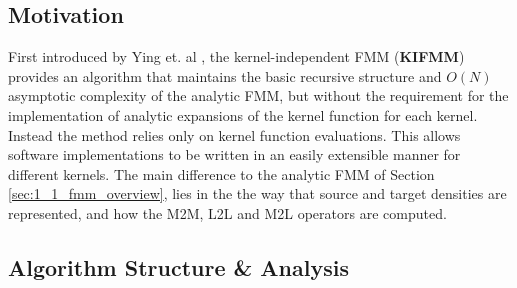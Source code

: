 \subsection{Motivation}

First introduced by Ying et. al \cite{Ying:2004:JCP}, the kernel-independent FMM (\textbf{\gls{KIFMM}})
provides an algorithm that maintains the basic recursive structure and $O(N)$
asymptotic complexity of the analytic FMM, but without the requirement for the
implementation of analytic expansions of the kernel function for each kernel.
Instead the method relies only on kernel function evaluations. This allows
software implementations to be written in an easily extensible manner for different
kernels. The main difference to the analytic FMM of Section \ref{sec:1_1_fmm_overview},
lies in the the way that source and target densities are represented, and how
the M2M, L2L and M2L operators are computed.

\subsection{Algorithm Structure \& Analysis}

